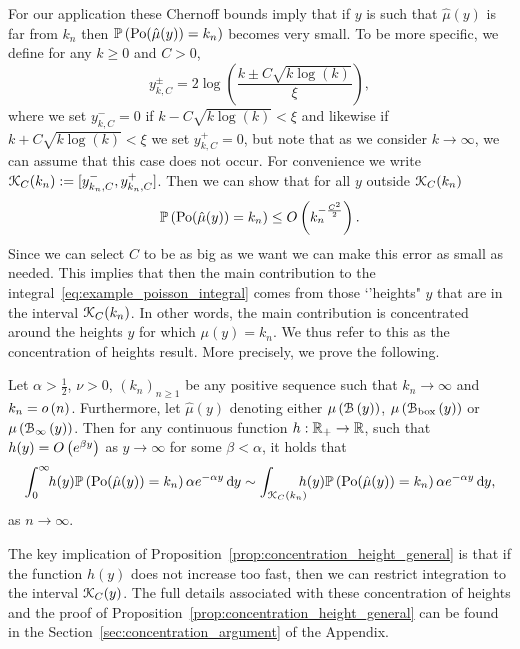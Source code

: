For our application these Chernoff bounds imply that if $y$ is such that $\hat{\mu}(y)$ is far from $k_n$ then $\mathbb{P}\left({\mathrm{Po}}(\hat{\mu}(y)) = k_n\right)$ becomes very small. To be more specific, we define for any $k \ge 0$ and $C > 0$,
\begin{equation}\label{eq:def_y_k_C}
	y_{k,C}^\pm = 2 \log\left(\frac{k \pm C \sqrt{k \log(k)}}{\xi}\right),
\end{equation}
where we set $y_{k,C}^- = 0$ if $k - C \sqrt{k \log(k)} < \xi$ and likewise if $k + C \sqrt{k \log(k)} < \xi$ we set $y_{k,C}^+=0$, but  note that as we consider $k\rightarrow\infty$, we can assume that this case does not occur. For convenience we write ${\mathcal K}_C(k_n) := [y_{k_n,C}^-, y_{k_n,C}^+]$. Then we can show that for all $y$ outside ${\mathcal K}_C(k_n)$
\begin{equation}\label{eq:chernoff_bound_degrees}
	\mathbb{P}\left({\mathrm{Po}}(\hat{\mu}(y)) = k_n\right) \le O\left(k_n^{-\frac{C^2}{2}}\right).
\end{equation}
Since we can select $C$ to be as big as we want we can make this error as small as needed. This implies that then the main contribution to the integral~\eqref{eq:example_poisson_integral} comes from those `'heights" $y$ that are in the interval ${\mathcal K}_C(k_n)$. In other words, the main contribution is concentrated around the heights $y$ for which $\mu(y) = k_n$. We thus refer to this as the concentration of heights result. More precisely, we prove the following.

\begin{proposition}\label{prop:concentration_height_general}
Let $\alpha > \frac{1}{2}$, $\nu > 0$, $(k_n)_{n \ge 1}$ be any positive sequence such that $k_n \to \infty$ and $k_n = o\left(n\right)$. Furthermore, let $\hat{\mu}(y)$ denoting either $\mu\left({\mathcal B}\left(y\right)\right)$, $\mu\left({\mathcal B}_{\text{box}}\left(y\right)\right)$ or $\mu\left({\mathcal B}_{\infty}\left(y\right)\right)$. Then for any continuous function $h : {\mathbb R}_+ \rightarrow  {\ensuremath{\mathbb R}}$, such that $h(y) = O\left(e^{\beta y}\right)$ as $y \to \infty$ for some $\beta < \alpha$, it holds that
\begin{equation}\label{eq:error_bound_int_rho_not_K}
	\int_0^\infty \hspace{-3pt} h(y) \mathbb{P}\left({\mathrm{Po}}(\hat{\mu}(y)) = k_n\right) \alpha e^{-\alpha y} \operatorname{\mathrm{d}\hspace{-2pt}} y
	\sim \int_{{\mathcal K}_C(k_n)} \hspace{-8pt} h(y) \mathbb{P}\left({\mathrm{Po}}(\hat{\mu}(y)) = k_n\right) \alpha e^{-\alpha y} \operatorname{\mathrm{d}\hspace{-2pt}} y,
\end{equation}
as $n \to \infty$.
\end{proposition}


The key implication of Proposition~\ref{prop:concentration_height_general} is that if the function $h(y)$ does not increase too fast, then we can restrict integration to the interval ${\mathcal K}_C(y)$. The full details associated with these concentration of heights and the proof of Proposition~\ref{prop:concentration_height_general} can be found in the Section~\ref{sec:concentration_argument} of the Appendix.

